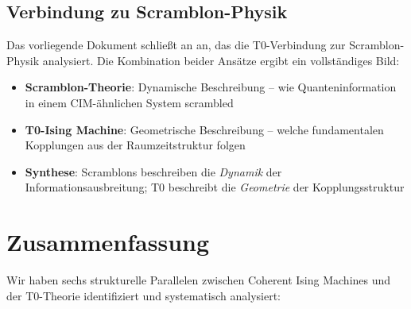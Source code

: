 \subsection{Verbindung zu Scramblon-Physik}

Das vorliegende Dokument schließt an \cite{pascher_scramblons_2026} an, das die 
T0-Verbindung zur Scramblon-Physik analysiert. Die Kombination beider Ansätze 
ergibt ein vollständiges Bild:

\begin{itemize}
    \item \textbf{Scramblon-Theorie}: Dynamische Beschreibung -- wie Quanteninformation 
    in einem CIM-ähnlichen System scrambled
    \item \textbf{T0-Ising Machine}: Geometrische Beschreibung -- welche fundamentalen 
    Kopplungen aus der Raumzeitstruktur folgen
    \item \textbf{Synthese}: Scramblons beschreiben die \emph{Dynamik} der 
    Informationsausbreitung; T0 beschreibt die \emph{Geometrie} der Kopplungsstruktur
\end{itemize}

\clearpage

\section{Zusammenfassung}
\label{sec:summary}

Wir haben sechs strukturelle Parallelen zwischen Coherent Ising Machines und der 
T0-Theorie identifiziert und systematisch analysiert:

\begin{table}[h]
    \centering
    \caption{Zusammenfassung: Sechs Parallelen T0 $\leftrightarrow$ CIM}
    \label{tab:summary}
\end{table}

